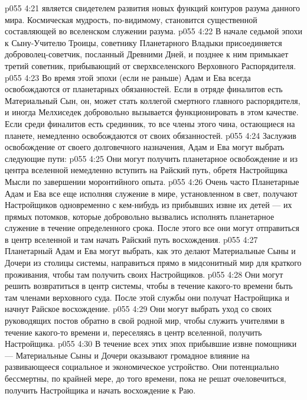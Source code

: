 \vs p055 4:21 \pc {}\bibnobreakspace {} является свидетелем развития новых функций контуров разума данного мира. Космическая мудрость, по\hyp{}видимому, становится существенной составляющей во вселенском служении разума.
\vs p055 4:22 \pc {}\bibnobreakspace {} В начале седьмой эпохи к Сыну\hyp{}Учителю Троицы, советнику Планетарного Владыки присоединяется доброволец\hyp{}советчик, посланный Древними Дней, и позднее к ним примыкает третий советник, прибывающий от сверхвселенского Верховного Распорядителя.
\vs p055 4:23 Во время этой эпохи (если не раньше) Адам и Ева всегда освобождаются от планетарных обязанностей. Если в отряде финалитов есть Материальный Сын, он, может стать коллегой смертного главного распорядителя, и иногда Мелхиседек добровольно вызывается функционировать в этом качестве. Если среди финалитов есть срединник, то все члены этого чина, остающиеся на планете, немедленно освобождаются от своих обязанностей.
\vs p055 4:24 \pc Заслужив освобождение от своего долговечного назначения, Адам и Ева могут выбрать следующие пути:
\vs p055 4:25 \bibnobreakspace Они могут получить планетарное освобождение и из центра вселенной немедленно вступить на Райский путь, обретя Настройщика Мысли по завершении моронтийного опыта.
\vs p055 4:26 \pc {}\bibnobreakspace Очень часто Планетарные Адам и Ева все еще исполняя служение в мире, установленном в свет, получают Настройщиков одновременно с кем\hyp{}нибудь из прибывших извне их детей --- их прямых потомков, которые добровольно вызвались исполнять планетарное служение в течение определенного срока. После этого все они могут отправиться в центр вселенной и там начать Райский путь восхождения.
\vs p055 4:27 \pc {}\bibnobreakspace Планетарный Адам и Ева могут выбрать, как это делают Материальные Сыны и Дочери из столицы системы, направиться прямо в мидсонитный мир для краткого проживания, чтобы там получить своих Настройщиков.
\vs p055 4:28 \pc {}\bibnobreakspace Они могут решить возвратиться в центр системы, чтобы в течение какого\hyp{}то времени быть там членами верховного суда. После этой службы они получат Настройщика и начнут Райское восхождение.
\vs p055 4:29 \pc {}\bibnobreakspace Они могут выбрать уход со своих руководящих постов обратно в свой родной мир, чтобы служить учителями в течение какого\hyp{}то времени и, переселяясь в центр вселенной, получить Настройщика.
\vs p055 4:30 \pc В течение всех этих эпох прибывшие извне помощники --- Материальные Сыны и Дочери оказывают громадное влияние на развивающееся социальное и экономическое устройство. Они потенциально бессмертны, по крайней мере, до того времени, пока не решат очеловечиться, получить Настройщика и начать восхождение к Раю.
